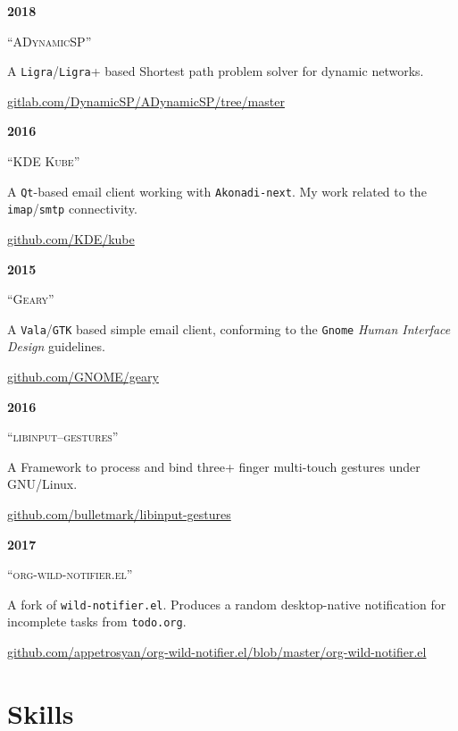 \documentclass{article}
\newcommand{\bipart}[2]
{
  \noindent
  \begin{minipage}[h]{0.06\textwidth}
    #1
  \end{minipage}
  \vrule \hspace{0.15in}
  \begin{minipage}[h]{0.85\textwidth}
    #2
  \end{minipage}
  \vspace{0.15in}
  \normalsize
}
\newcommand{\project}[4]
{
  \bipart{\textbf{#2}}
  { \large
    ``\textsc{#1}''
    
    \normalsize
    #4
    
    
    \footnotesize
    \hfill \href{http://#3}{\textsf{#3}}}
}
\begin{document}
\project{ADynamicSP}
{2018}
{gitlab.com/DynamicSP/ADynamicSP/tree/master}
{A \texttt{Ligra}/\texttt{Ligra}+ based Shortest path problem solver for dynamic networks. }

\project{KDE Kube}
{2016}
{github.com/KDE/kube}
{A \texttt{Qt}-based email client working with \texttt{Akonadi-next}. My work related to the \texttt{imap}/\texttt{smtp} connectivity. }

\project{Geary}
{2015}
{github.com/GNOME/geary}
{A \texttt{Vala}/\texttt{GTK} based simple email client, conforming to the \texttt{Gnome} \emph{Human Interface Design} guidelines.}

\project{libinput--gestures}
{2016}
{github.com/bulletmark/libinput-gestures}
{A Framework to process and bind three+ finger multi-touch gestures under GNU/Linux. }

\project{org-wild-notifier.el}
{2017}
{github.com/appetrosyan/org-wild-notifier.el/blob/master/org-wild-notifier.el}
{A fork of \texttt{wild-notifier.el}. Produces a random desktop-native notification for incomplete tasks from \texttt{todo.org}. }



\section*{Skills}
\end{document}
